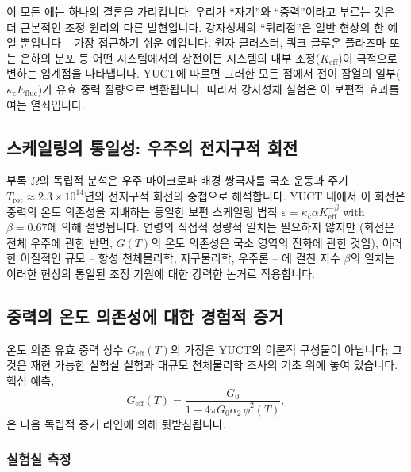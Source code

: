 \documentclass[11pt,a4paper]{article}
\begin{document}
	이 모든 예는 하나의 결론을 가리킵니다: 우리가 ``자기''와 ``중력''이라고 부르는 것은 더 근본적인 조정 원리의 다른 발현입니다. 강자성체의 ``퀴리점''은 일반 현상의 한 예일 뿐입니다 – 가장 접근하기 쉬운 예입니다. 원자 클러스터, 쿼크-글루온 플라즈마 또는 은하의 분포 등 어떤 시스템에서의 상전이든 시스템의 내부 조정($K_{\mathrm{eff}}$)이 극적으로 변하는 임계점을 나타냅니다. YUCT에 따르면 그러한 모든 점에서 전이 잠열의 일부($\kappa_c E_{\mathrm{fluc}}$)가 유효 중력 질량으로 변환됩니다. 따라서 강자성체 실험은 이 보편적 효과를 여는 열쇠입니다.
	
	\subsection{스케일링의 통일성: 우주의 전지구적 회전}
	
	부록 $\Omega$의 독립적 분석은 우주 마이크로파 배경 쌍극자를 국소 운동과 주기 $T_{\mathrm{rot}} \approx 2.3\times10^{14}$년의 전지구적 회전의 중첩으로 해석합니다. YUCT 내에서 이 회전은 중력의 온도 의존성을 지배하는 동일한 보편 스케일링 법칙 $\varepsilon = \kappa_c \alpha K_{\mathrm{eff}}^{-\beta}$ with $\beta = 0.67$에 의해 설명됩니다. 연령의 직접적 정량적 일치는 필요하지 않지만 (회전은 전체 우주에 관한 반면, $G(T)$의 온도 의존성은 국소 영역의 진화에 관한 것임), 이러한 이질적인 규모 – 항성 천체물리학, 지구물리학, 우주론 – 에 걸친 지수 $\beta$의 일치는 이러한 현상의 통일된 조정 기원에 대한 강력한 논거로 작용합니다.
	
	\subsection{중력의 온도 의존성에 대한 경험적 증거}
	\label{sec:empirical}
	
	온도 의존 유효 중력 상수 $G_{\mathrm{eff}}(T)$의 가정은 YUCT의 이론적 구성물이 아닙니다; 그것은 재현 가능한 실험실 실험과 대규모 천체물리학 조사의 기초 위에 놓여 있습니다. 핵심 예측,
	\begin{equation}
		G_{\mathrm{eff}}(T) = \frac{G_0}{1 - 4\pi G_0\alpha_2\,\phi^2(T)},
	\end{equation}
	은 다음 독립적 증거 라인에 의해 뒷받침됩니다.
	
	\subsubsection*{실험실 측정}
	
\end{document}
